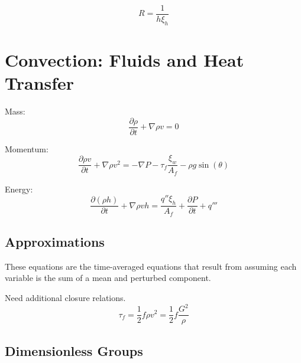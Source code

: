 \documentclass{article}
\begin{document}
\begin{equation}
    R = \frac{1}{h \xi_h}
\end{equation}

\section{Convection: Fluids and Heat Transfer}
Mass:
\begin{equation}
    \frac{\partial \rho}{\partial t}  + \nabla \rho v = 0
\end{equation}

Momentum:
\begin{equation}
    \frac{\partial \rho v}{\partial t} + \nabla \rho v^2 = -\nabla P - \tau_f \frac{\xi_w}{A_f} - \rho g \sin(\theta)
\end{equation}

Energy:
\begin{equation}
    \frac{\partial (\rho h)}{\partial t} + \nabla \rho v h = \frac{q'' \xi_h}{A_f} + \frac{\partial P}{\partial t} + q'''
\end{equation}

\subsection{Approximations}
These equations are the time-averaged equations that result from assuming each variable is the sum of a mean and perturbed component.

Need additional closure relations.
\begin{equation}
    \tau_f = \frac{1}{2} f \rho v^2 = 
    \frac{1}{2} f \frac{G^2}{\rho}
\end{equation}

\subsection{Dimensionless Groups}
\end{document}
